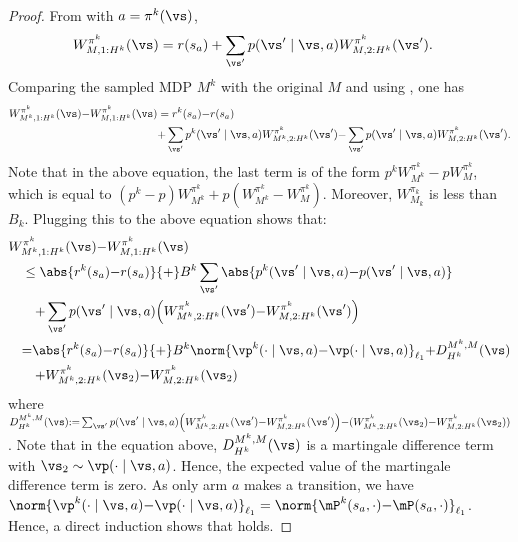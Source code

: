 \begin{subappendices}
\begin{proof}
    From  with $a=\pi^k(\vs)$,
    \begin{align}
        W^{\pi^k}_{M, 1:H^k}(\vs) 
        &=r(s_a) + \sum_{\vs'} p(\vs' \mid \vs,a)W^{\pi^k}_{M,2:H^k}(\vs'). \label{eq:decompo2}
    \end{align}
    Comparing the sampled MDP $M^k$ with the original $M$ and using , one has
    \begin{align}
        W^{\pi^k}_{M^k, 1:H^k}(\vs) {-} W^{\pi^k}_{M, 1:H^k}(\vs)
        &= r^k(s_a) {-} r(s_a) \nonumber \\
        &{+} \sum_{\vs'} p^k(\vs'\mid \vs,a)W^{\pi^k}_{M^k, 2:H^k}(\vs') {-} \sum_{\vs'} p(\vs' \mid \vs,a)W^{\pi^k}_{M,2:H^k}(\vs') \label{eq:depend_S}.
    \end{align}
    Note that in the above equation, the last term is of the form $p^kW^{\pi^k}_{M^k} {-}pW^{\pi^k}_{M}$, which is equal to $(p^k {-}p)W^{\pi^k}_{M^k} {+}p(W^{\pi^k}_{M^k} {-}W^{\pi^k}_{M})$. Moreover, $W_{M_k}^{\pi_k}$ is less than $B_k$.
    Plugging this to the above equation shows that:
    \begin{align*}
        &W^{\pi^k}_{M^k, 1:H^k}(\vs) {-} W^{\pi^k}_{M, 1:H^k}(\vs) \\
        &\quad\le \abs{r^k(s_a) {-} r(s_a)} {+} B^k\sum_{\vs'}\abs{p^k(\vs'\mid \vs,a) {-} p(\vs' \mid \vs,a)}\\
        &\qquad {+} \sum_{\vs'} p(\vs' \mid \vs,a)\Bigl(W^{\pi^k}_{M^k, 2:H^k}(\vs') {-} W^{\pi^k}_{M, 2:H^k}(\vs')\Bigr)\\
        &\quad {=}\abs{r^k(s_a) {-} r(s_a)} {+} B^k\norm{\vp^k(\cdot\mid \vs,a) {-} \vp(\cdot \mid \vs,a)}_{\ell_1} {+} D^{M^k,M}_{H^k}(\vs) \\
        &\qquad {+}W^{\pi^k}_{M^k, 2:H^k}(\vs_2) {-} W^{\pi^k}_{M, 2:H^k}(\vs_2)
    \end{align*}
    where $D^{M^k,M}_{H^k}(\vs){:=} \sum_{\vs'}p(\vs' \mid \vs,a)\Bigl(W^{\pi^k}_{M^k, 2:H^k}(\vs') {-} W^{\pi^k}_{M, 2:H^k}(\vs')\Bigr) {-}(W^{\pi^k}_{M^k, 2:H^k}(\vs_2) {-} W^{\pi^k}_{M, 2:H^k}(\vs_2))$.
    Note that in the equation above, $D^{M^k,M}_{H^k}(\vs)$ is a martingale difference term with ${\vs_2\sim \vp(\cdot \mid \vs,a)}$.
    Hence, the expected value of the martingale difference term is zero.
    As only arm $a$ makes a transition, we have $\norm{\vp^k(\cdot\mid \vs,a) {-} \vp(\cdot \mid \vs,a)}_{\ell_1}=\norm{\mP^{k}(s_{a},\cdot){-}\mP(s_{a},\cdot)}_{\ell_1}$. Hence, a direct induction shows that  holds.
\end{proof}


\end{subappendices}
